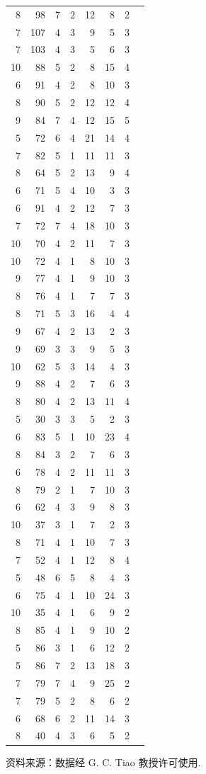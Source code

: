 \begin{mvtable}
\begin{longtable}{rrrrrrrr}
8 & 98 & 7 & 2 & 12 & 8 & 2 \\
7 & 107 & 4 & 3 & 9 & 5 & 3 \\
7 & 103 & 4 & 3 & 5 & 6 & 3 \\
10 & 88 & 5 & 2 & 8 & 15 & 4 \\
6 & 91 & 4 & 2 & 8 & 10 & 3 \\
8 & 90 & 5 & 2 & 12 & 12 & 4 \\
9 & 84 & 7 & 4 & 12 & 15 & 5 \\
5 & 72 & 6 & 4 & 21 & 14 & 4 \\
7 & 82 & 5 & 1 & 11 & 11 & 3 \\
8 & 64 & 5 & 2 & 13 & 9 & 4 \\
6 & 71 & 5 & 4 & 10 & 3 & 3 \\
6 & 91 & 4 & 2 & 12 & 7 & 3 \\
7 & 72 & 7 & 4 & 18 & 10 & 3 \\
10 & 70 & 4 & 2 & 11 & 7 & 3 \\
10 & 72 & 4 & 1 & 8 & 10 & 3 \\
9 & 77 & 4 & 1 & 9 & 10 & 3 \\
8 & 76 & 4 & 1 & 7 & 7 & 3 \\
8 & 71 & 5 & 3 & 16 & 4 & 4 \\
9 & 67 & 4 & 2 & 13 & 2 & 3 \\
9 & 69 & 3 & 3 & 9 & 5 & 3 \\
10 & 62 & 5 & 3 & 14 & 4 & 3 \\
9 & 88 & 4 & 2 & 7 & 6 & 3 \\
8 & 80 & 4 & 2 & 13 & 11 & 4 \\
5 & 30 & 3 & 3 & 5 & 2 & 3 \\
6 & 83 & 5 & 1 & 10 & 23 & 4 \\
8 & 84 & 3 & 2 & 7 & 6 & 3 \\
6 & 78 & 4 & 2 & 11 & 11 & 3 \\
8 & 79 & 2 & 1 & 7 & 10 & 3 \\
6 & 62 & 4 & 3 & 9 & 8 & 3 \\
10 & 37 & 3 & 1 & 7 & 2 & 3 \\
8 & 71 & 4 & 1 & 10 & 7 & 3 \\
7 & 52 & 4 & 1 & 12 & 8 & 4 \\
5 & 48 & 6 & 5 & 8 & 4 & 3 \\
6 & 75 & 4 & 1 & 10 & 24 & 3 \\
10 & 35 & 4 & 1 & 6 & 9 & 2 \\
8 & 85 & 4 & 1 & 9 & 10 & 2 \\
5 & 86 & 3 & 1 & 6 & 12 & 2 \\
5 & 86 & 7 & 2 & 13 & 18 & 3 \\
7 & 79 & 7 & 4 & 9 & 25 & 2 \\
7 & 79 & 5 & 2 & 8 & 6 & 2 \\
6 & 68 & 6 & 2 & 11 & 14 & 3 \\
8 & 40 & 4 & 3 & 6 & 5 & 2 \\
\end{longtable}
\end{mvtable}

{ 资料来源：数据经 G. C. Tiao 教授许可使用.}
